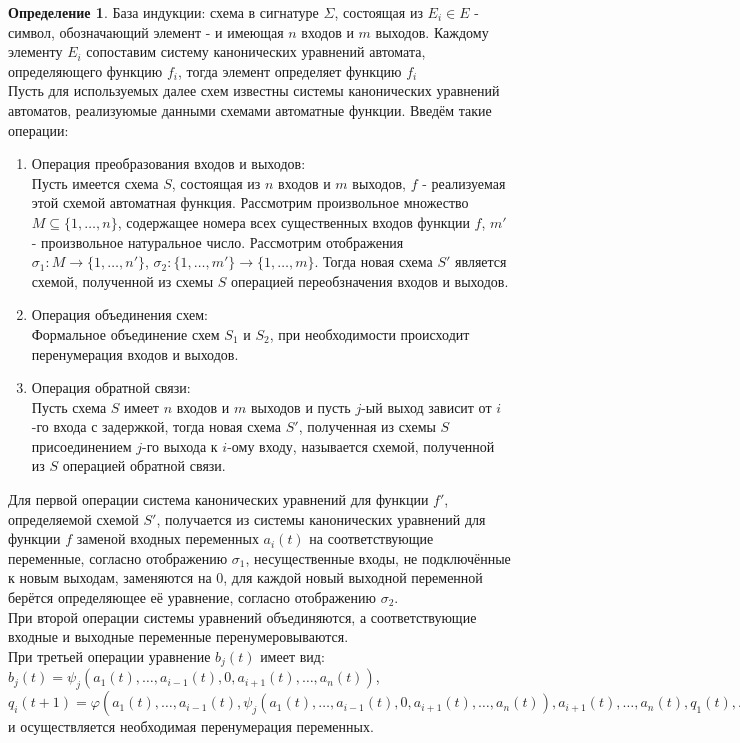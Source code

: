 \documentclass[a4paper, 12pt]{article}
\renewcommand{\phi}{\varphi}
\theoremstyle{definition}
\newtheorem*{definition}{Определение}
\theoremstyle{plain}
\theoremstyle{remark}
\begin{document}
  \begin{definition}
    База индукции: схема в сигнатуре $\Sigma$, состоящая из $E_i\in E$ - символ, обозначающий элемент - и имеющая $n$ входов и $m$ выходов. Каждому элементу $E_i$ сопоставим систему канонических уравнений автомата, определяющего функцию $f_i$, тогда элемент определяет функцию $f_i$\\
    Пусть для используемых далее схем известны системы канонических уравнений автоматов, реализуюмые данными схемами автоматные функции. Введём такие операции:\\
    \begin{enumerate}
      \item Операция преобразования входов и выходов:\\
      Пусть имеется схема $S$, состоящая из $n$ входов и $m$ выходов, $f$ - реализуемая этой схемой автоматная функция. Рассмотрим произвольное множество $M\subseteq\{1,\ldots,n\}$, содержащее номера всех существенных входов функции $f$, $m'$ - произвольное натуральное число. Рассмотрим отображения $\sigma_1:M\rightarrow\{1,\ldots,n'\}$, $\sigma_2:\{1,\ldots,m'\}\rightarrow\{1,\ldots,m\}$. Тогда новая схема $S'$ является схемой, полученной из схемы $S$ операцией переобзначения входов и выходов.
      \item Операция объединения схем:\\
      Формальное объединение схем $S_1$ и $S_2$, при необходимости происходит перенумерация входов и выходов.
      \item Операция обратной связи:\\
      Пусть схема $S$ имеет $n$ входов и $m$ выходов и пусть $j$-ый выход зависит от $i$-го входа с задержкой, тогда новая схема $S'$, полученная из схемы $S$ присоединением $j$-го выхода к $i$-ому входу, называется схемой, полученной из $S$ операцией обратной связи.
    \end{enumerate}
    Для первой операции система канонических уравнений для функции $f'$, определяемой схемой $S'$, получается из системы канонических уравнений для функции $f$ заменой входных переменных $a_i(t)$ на соответствующие переменные, согласно отображению $\sigma_1$, несущественные входы, не подключённые к новым выходам, заменяются на 0, для каждой новый выходной переменной берётся определяющее её уравнение, согласно отображению $\sigma_2$.\\
    При второй операции системы уравнений объединяются, а соответствующие входные и выходные переменные перенумеровываются.\\
    При третьей операции уравнение $b_j(t)$ имеет вид: $b_j(t)=\psi_j(a_1(t),\ldots,a_{i-1}(t),0,a_{i+1}(t),\ldots,a_n(t))$, $q_i(t+1)=\phi(a_1(t),\ldots,a_{i-1}(t),\psi_j(a_1(t),\ldots,a_{i-1}(t),0,a_{i+1}(t),\ldots,a_n(t)),a_{i+1}(t),\ldots,a_n(t),q_1(t),\ldots,q_k(t))$ и осуществляется необходимая перенумерация переменных.
  \end{definition}
\end{document}

